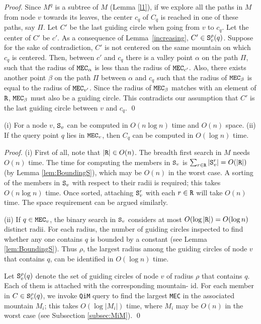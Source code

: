 \documentclass[12pt]{llncs}
\begin{document}
\begin{proof}
Since $M^q$ is a subtree of $M$ (Lemma \ref{l1}), if we explore all the paths in $M$ 
from node $v$ towards its leaves, the center $c_q$ of $C_q$ is reached in one 
of these paths, say $\Pi$. Let $C'$ be the  last guiding circle when going from $v$ to 
$c_q$. Let the center of $C'$ be $c'$. As a consequence of Lemma\ \ref{increasing}, 
$C' \in {\tt S}_v^\rho(q)$. Suppose for the sake of contradiction, $C'$ is not centered 
on the same mountain on which $c_q$ is centered. Then,  between $c'$ and $c_q$ 
there is a valley point 
$\alpha$ on the path $\Pi$, such that the radius of ${\tt MEC}_\alpha$ is 
less than the radius of ${\tt MEC}_{c'}$. Also, there exists another point 
$\beta$ on the path $\Pi$ between $\alpha$ and $c_q$ such that the radius of 
${\tt MEC}_\beta$ is equal to the radius of ${\tt MEC}_{v'}$. Since the radius 
of ${\tt MEC}_\beta$ matches with an element of ${\tt R}$, ${\tt MEC}_\beta$ 
must  also be a guiding circle. This contradicts our assumption that $C'$ is the last
guiding circle between $v$ and $c_q$.  
\qed
\end{proof}

\begin{lemma} \label{lem:prep}
(i) For a node $v$, ${\tt S}_v$ can be computed in $O(n \log n)$ time and 
$O(n)$ space. (ii) If the query point $q$ lies in ${\tt MEC}_v$, then $C_q$ can be 
computed in $O(\log n)$ time. 
\end{lemma}

\begin{proof}
(i) First of all, note that $|{\tt R}| \in O(n)$. The breadth first search in $M$ needs 
$O(n)$ time. The time for computing 
the members in ${\tt S}_v$ is $\sum_{r \in {\tt R}} |{\tt S}_v^r| = O(|{\tt R}|)$ 
(by Lemma \ref{lem:BoundingS}), which may be $O(n)$ in the worst case. 
A sorting of the members in ${\tt S}_v$ with respect to their radii is required; this takes 
$O(n \log n)$ time. Once sorted, attaching ${\tt S}_v^r$ with each $r \in {\tt R}$ will 
take $O(n)$ time. The space requirement can be argued similarly.

(ii)  If $q \in {\tt MEC}_v$, the binary search in ${\tt S}_v$ considers at most 
$O(\log |{\tt R}|) = O(\log n) $ distinct radii. For each radius, the number of guiding 
circles inspected to find whether any one contains $q$ is bounded by a constant 
(see Lemma \ref{lem:BoundingS}). Thus $\rho$, the largest radius among the guiding 
circles of node $v$ that contains $q$, can be identified in $O(\log n)$ time.

Let ${\tt S}_v^\rho(q)$ denote the set of guiding circles of node $v$ of radius 
$\rho$ that contains $q$. Each of them is attached with the corresponding mountain-
id. 
For each member in $C \in {\tt S}_v^\rho(q)$, we invoke {\tt QiM} query to find the 
largest {\tt MEC} in the associated mountain $M_i$; this takes $O(\log |M_i|)$ time, 
where $M_i$ may be $O(n)$ in the worst case (see Subsection \ref{subsec:MiM}).  
\qed
\end{proof}
\end{document}
